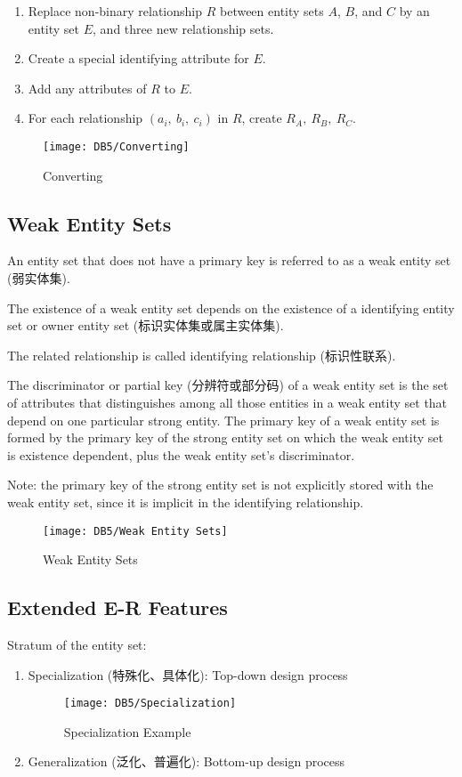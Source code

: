 \begin{enumerate}
    \item Replace non-binary relationship $R$ between entity sets $A$, $B$, and $C$ by an entity set $E$, and three new relationship sets.
    \item Create a special identifying attribute for $E$.
    \item Add any attributes of $R$ to $E$.
    \item For each relationship $(a_i,\ b_i,\ c_i)$ in $R$, create $R_A,\ R_B,\ R_C$. 
\end{enumerate}

\begin{figure}[H]
    \centering
    \texttt{[image: DB5/Converting]}
    \caption{Converting}
\end{figure}


\subsection{Weak Entity Sets}
An entity set that does not have a primary key is referred to as a weak entity set (弱实体集).

The existence of a weak entity set depends on the existence of a identifying entity set or owner entity set (标识实体集或属主实体集). 

The related relationship is called identifying relationship (标识性联系). 

The discriminator or partial key (分辨符或部分码) of a weak entity set is the set of attributes that distinguishes among all those entities in a weak entity set that depend on one particular strong entity. The primary key of a weak entity set is formed by the primary key of the strong entity set on which the weak entity set is existence dependent, plus the weak entity set’s discriminator.

Note: the primary key of the strong entity set is not explicitly stored with the weak entity set, since it is implicit in the identifying relationship. 

\begin{figure}[H]
    \centering
    \texttt{[image: DB5/Weak Entity Sets]}
    \caption{Weak Entity Sets}
\end{figure}


\subsection{Extended E-R Features}
Stratum of the entity set:
\begin{enumerate}
    \item Specialization (特殊化、具体化): Top-down design process
    \begin{figure}[H]
        \centering
        \texttt{[image: DB5/Specialization]}
        \caption{Specialization Example}
    \end{figure}
    
    \item Generalization (泛化、普遍化): Bottom-up design process
\end{enumerate}

